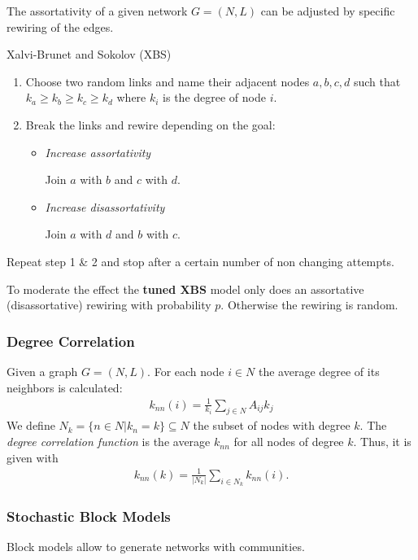 \documentclass[english]{panikzettel}
\begin{document}
The assortativity of a given network $ G = (N,L) $ can be adjusted by specific rewiring of the edges.

\begin{algo}{Xalvi-Brunet and Sokolov (XBS)}
\begin{enumerate}
	\item Choose two random links and name their adjacent nodes $ a,b,c,d $ such that $ k_a \geq k_b \geq k_c \geq k_d $ where $ k_i $ is the degree of node $ i $.
	\item Break the links and rewire depending on the goal:
	\begin{itemize}
		\item \textit{Increase assortativity}

		Join $ a $ with $ b $ and $ c $ with $ d $.

		\item \textit{Increase disassortativity}

		Join $ a $ with $ d $ and $ b $ with $ c $.
	\end{itemize}
\end{enumerate}
Repeat step 1 \& 2  and stop after a certain number of non changing attempts.
\end{algo}

To moderate the effect the \textbf{tuned XBS} model only does an assortative (disassortative) rewiring with probability $ p $.
Otherwise the rewiring is random.

\subsubsection{Degree Correlation}
Given a graph $ G = (N,L) $.
For each node $ i \in N $ the average degree of its neighbors is calculated:
\begin{align*}
	k_{nn} (i) = \frac{1}{k_i} \sum\limits_{j \in N} A_{ij} k_j
\end{align*}
We define $ N_k = \{n \in N | k_n = k\} \subseteq N $ the subset of nodes with degree $ k $.
The \emph{degree correlation function} is the average $ k_{nn} $ for all nodes of degree $ k $.
Thus, it is given with
\begin{align*}
	k_{nn}(k) = \frac{1}{|N_k|} \sum\limits_{i \in N_k} k_{nn}(i).
\end{align*}

\subsubsection{Stochastic Block Models}
Block models allow to generate networks with communities.
\end{document}
